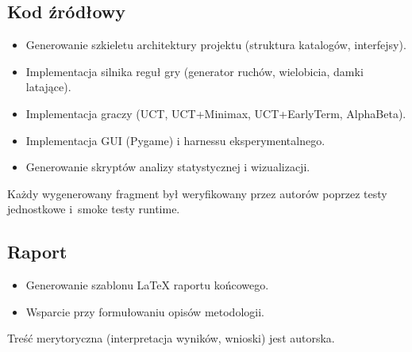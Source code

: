 \documentclass[12pt,a4paper]{article}
\begin{document}
\subsection{Kod źródłowy}
\begin{itemize}[nosep]
  \item Generowanie szkieletu architektury projektu (struktura katalogów, interfejsy).
  \item Implementacja silnika reguł gry (generator ruchów, wielobicia, damki latające).
  \item Implementacja graczy (UCT, UCT+Minimax, UCT+EarlyTerm, AlphaBeta).
  \item Implementacja GUI (Pygame) i harnessu eksperymentalnego.
  \item Generowanie skryptów analizy statystycznej i wizualizacji.
\end{itemize}
Każdy wygenerowany fragment był weryfikowany przez autorów poprzez testy jednostkowe i~smoke testy runtime.

\subsection{Raport}
\begin{itemize}[nosep]
  \item Generowanie szablonu LaTeX raportu końcowego.
  \item Wsparcie przy formułowaniu opisów metodologii.
\end{itemize}
Treść merytoryczna (interpretacja wyników, wnioski) jest autorska.

\printbibliography
\end{document}
